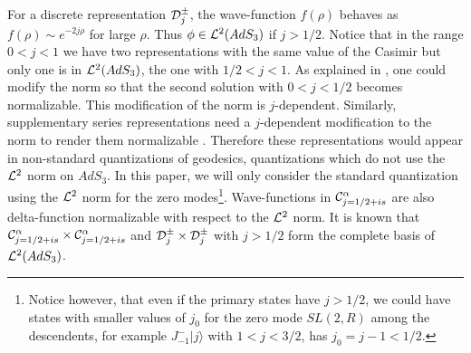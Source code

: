 %

For a discrete representation ${\cal D}_j^\pm$,
the wave-function $f(\rho)$ behaves as $f(\rho)
\sim e^{- 2 j \rho}$ for large $\rho$. Thus 
$\phi \in {\cal L}^2(AdS_3)$ if  $j > 1/2$.
Notice that in the range $0<j<1$ we have two representations with
the same value of the Casimir but only one is in ${\cal L}^2(AdS_3)$,
the one with $ 1/2 < j<1$.
As explained in  \cite{Klebanov:1999tb}, one could modify the norm
so that the second solution with $0<j<1/2$ becomes normalizable. 
This modification of the norm is $j$-dependent. Similarly, supplementary 
series representations need a $j$-dependent modification to the 
norm to render them normalizable \cite{sugiura}. Therefore these 
representations would appear in non-standard quantizations 
of geodesics,
quantizations which do not use the ${\cal L}^2$ norm on $AdS_3$. 
In this paper, we will only consider the standard quantization
using the ${\cal L}^2$ norm for the zero modes\footnote{
Notice however, that even if the primary states 
 have $j>1/2$, we could have states with smaller values of $j_0$ for the 
zero mode $SL(2,R)$ among the descendents,  for example 
$J^-_{-1} | j\rangle$ with 
$ 1<j<3/2$, has $j_{0} = j-1 <1/2$.}.
Wave-functions in ${\cal C}^\alpha_{j=1/2+is}$ are 
also delta-function normalizable with respect to the ${\cal L}^2$ norm. 
It is known that ${\cal C}^\alpha_{j=1/2+is} \times 
{\cal C}^\alpha_{j=1/2+is}$ and ${\cal D}_j^\pm \times {\cal D}_j^\pm$ 
with $j > 1/2$ form the complete basis of ${\cal L}^2(AdS_3)$. 

